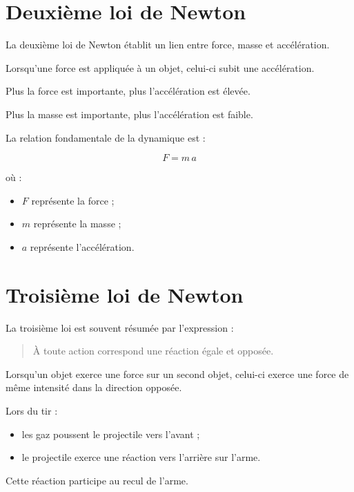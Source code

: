 \section{Deuxième loi de Newton}

La deuxième loi de Newton établit un lien entre force, masse et accélération.

Lorsqu'une force est appliquée à un objet, celui-ci subit une accélération.

Plus la force est importante, plus l'accélération est élevée.

Plus la masse est importante, plus l'accélération est faible.

\begin{rigueur}

La relation fondamentale de la dynamique est :

    \begin{equation}
        F = m\,a
        \label{eq:newton2}
    \end{equation}

où :

\begin{itemize}
    \item $F$ représente la force ;
    \item $m$ représente la masse ;
    \item $a$ représente l'accélération.
\end{itemize}

\end{rigueur}

\section{Troisième loi de Newton}

La troisième loi est souvent résumée par l'expression :

\begin{quote}
À toute action correspond une réaction égale et opposée.
\end{quote}

Lorsqu'un objet exerce une force sur un second objet, celui-ci exerce une force
de même intensité dans la direction opposée.

\begin{exemple}

Lors du tir :

\begin{itemize}
\item les gaz poussent le projectile vers l'avant ;
\item le projectile exerce une réaction vers l'arrière sur l'arme.
\end{itemize}

Cette réaction participe au recul de l'arme.

\end{exemple}

